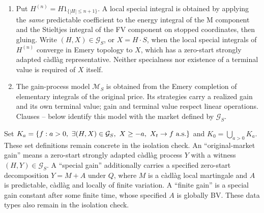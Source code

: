 \begin{definition}\label{def:boundary-data}
\leavevmode\par
\begin{enumerate}
\item {}
Put $H^{(n)}=H1_{\{|H|\leq n+1\}}$.
A local special integral is obtained by applying the \emph{same} predictable coefficient to the
energy integral of the M component and the Stieltjes integral of the FV component on stopped coordinates, then gluing.
Write $(H,X)\in\mathcal G_S$, or $X=H\cdot S$, when the local special integrals of $H^{(n)}$
converge in Emery topology to $X$, which has a zero-start strongly adapted c\`adl\`ag representative.
Neither specialness nor existence of a terminal value is required of $X$ itself.
\item {}
The gain-process model $\mathcal M_S$ is obtained from the Emery completion of elementary integrals of the original price.
Its strategies carry a realized gain and its own terminal value; gain and terminal value respect linear operations.
Clauses -- below identify this model with the market defined by $\mathcal G_S$.
\end{enumerate}
Set $K_a=\{f:a>0,\ \exists(H,X)\in\mathcal G_S,\ X\geq-a,\ X_t\to f\ \as\}$ and
$K_0=\bigcup_{a>0}K_a$. These set definitions remain concrete in the isolation check.
An ``original-market gain'' means a zero-start strongly adapted c\`adl\`ag process $Y$ with a witness $(H,Y)\in\mathcal G_S$.
A ``special gain'' additionally carries a specified zero-start decomposition $Y=M+A$ under $Q$,
where $M$ is a c\`adl\`ag local martingale and $A$ is predictable, c\`adl\`ag and locally of finite variation.
A ``finite gain'' is a special gain constant after some finite time, whose specified $A$ is globally BV.
These data types also remain in the isolation check.
\end{definition}

